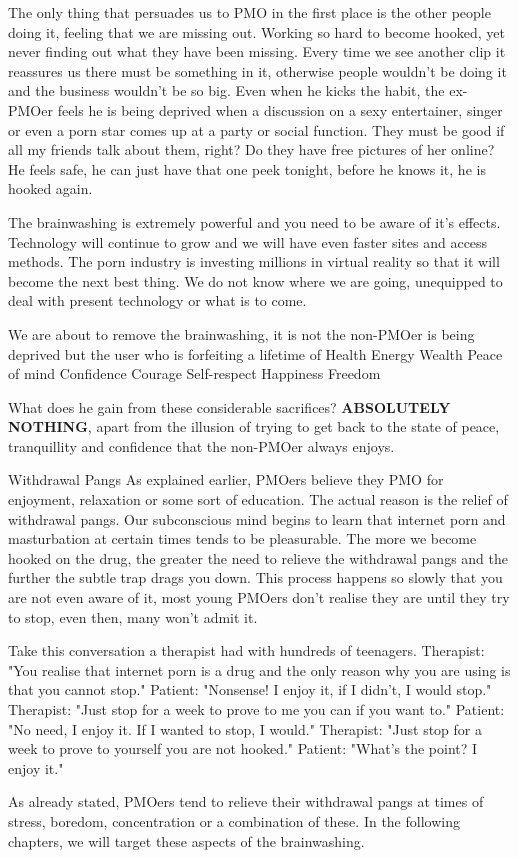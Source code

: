 The only thing that persuades us to PMO in the first place is the other people doing it, feeling that we are missing out. Working so hard to become hooked, yet never finding out what they have been missing. Every time we see another clip it reassures us there must be something in it, otherwise people wouldn't be doing it and the business wouldn't be so big. Even when he kicks the habit, the ex-PMOer feels he is being deprived when a discussion on a sexy entertainer, singer or even a porn star comes up at a party or social function. They must be good if all my friends talk about them, right? Do they have free pictures of her online? He feels safe, he can just have that one peek tonight, before he knows it, he is hooked again.

The brainwashing is extremely powerful and you need to be aware of it's effects. Technology will continue to grow and we will have even faster sites and access methods. The porn industry is investing millions in virtual reality so that it will become the next best thing. We do not know where we are going, unequipped to deal with present technology or what is to come.

We are about to remove the brainwashing, it is not the non-PMOer is being deprived but the user who is forfeiting a lifetime of
  Health
  Energy
  Wealth
  Peace of mind
  Confidence
  Courage
  Self-respect
  Happiness
  Freedom

What does he gain from these considerable sacrifices? \textbf{ABSOLUTELY NOTHING}, apart from the illusion of trying to get back to the state of peace, tranquillity and confidence that the non-PMOer always enjoys.

Withdrawal Pangs
As explained earlier, PMOers believe they PMO for enjoyment, relaxation or some sort of 
education. The actual reason is the relief of withdrawal pangs. Our subconscious mind begins to learn that internet porn and masturbation at certain times tends to be pleasurable. The more we become hooked on the drug, the greater the need to relieve the withdrawal pangs and the further the subtle trap drags you down. This process happens so slowly that you are not even aware of it, most young PMOers don't realise they are until they try to stop, even then, many won't admit it.

Take this conversation a therapist had with hundreds of teenagers.
  Therapist: "You realise that internet porn is a drug and the only reason why you are using is that you cannot stop."
  Patient: "Nonsense! I enjoy it, if I didn't, I would stop."
  Therapist: "Just stop for a week to prove to me you can if you want to."
  Patient: "No need, I enjoy it. If I wanted to stop, I would."
  Therapist: "Just stop for a week to prove to yourself you are not hooked."
  Patient: "What's the point? I enjoy it."

As already stated, PMOers tend to relieve their withdrawal pangs at times of stress, boredom, concentration or a combination of these. In the following chapters, we will target these aspects of the brainwashing.
